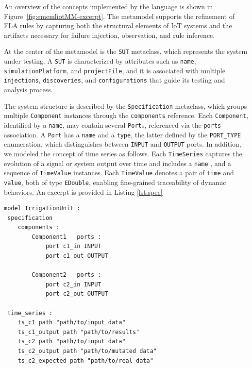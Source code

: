 An overview of the concepts implemented by the language is shown in Figure~\ref{fig:ememliotMM-excerpt}. The metamodel supports the refinement of FLA rules by capturing both the structural elements of IoT systems and the artifacts necessary for failure injection, observation, and rule inference.

At the center of the metamodel is the \texttt{SUT} metaclass, which represents the system under testing. A \texttt{SUT} is characterized by attributes such as \texttt{name}, \texttt{simulationPlatform}, and \texttt{projectFile}, and it is associated with multiple \texttt{injections}, \texttt{discoveries}, and \texttt{configurations} that guide its testing and analysis process.

The system structure is described by the \texttt{Specification} metaclass, which groups multiple \texttt{Component} instances through the \texttt{components} reference. Each \texttt{Component}, identified by a \texttt{name}, may contain several \texttt{Port}s, referenced via the \texttt{ports} association. A \texttt{Port} has a \texttt{name} and a \texttt{type}, the latter defined by the \texttt{PORT\_TYPE} enumeration, which distinguishes between \texttt{INPUT} and \texttt{OUTPUT} ports. In addition, we modeled the concept of time series as follows. Each \texttt{TimeSeries} captures the evolution of a signal or system output over time and includes a \texttt{name} %
, and a sequence of \texttt{TimeValue} instances. Each \texttt{TimeValue} denotes a pair of \texttt{time} and \texttt{value}, both of type \texttt{EDouble}, enabling fine-grained traceability of dynamic behaviors.
An excerpt is provided in Listing \ref{lst:spec}


\begin{lstlisting}[style=JavaStyle,caption={Specification of the components, ports and time series.},label=lst:spec]
model IrrigationUnit :
 specification
 	components :
	 	Component1	 ports :
	 		port c1_in INPUT
	 		port c1_out OUTPUT

	 	Component2	 ports :
	 		port c2_in INPUT
	 		port c2_out OUTPUT

 time_series :
 	ts_c1 path "path/to/input data"
	ts_c1_output path "path/to/results"	
	ts_c2 path "path/to/input data"
	ts_c2_output path "path/to/mutated data"
	ts_c2_expected path "path/to/real data"
\end{lstlisting}



